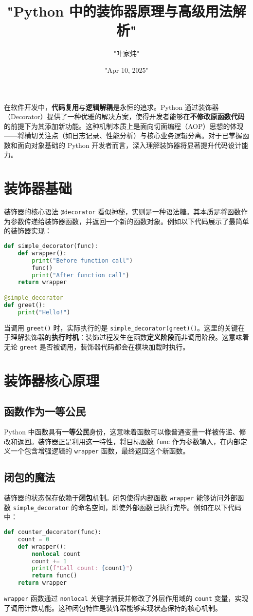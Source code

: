 \title{"Python 中的装饰器原理与高级用法解析"}
\author{"叶家炜"}
\date{"Apr 10, 2025"}
\maketitle
在软件开发中，\textbf{代码复用}与\textbf{逻辑解耦}是永恒的追求。Python 通过装饰器（Decorator）提供了一种优雅的解决方案，使得开发者能够在\textbf{不修改原函数代码}的前提下为其添加新功能。这种机制本质上是面向切面编程（AOP）思想的体现——将横切关注点（如日志记录、性能分析）与核心业务逻辑分离。对于已掌握函数和面向对象基础的 Python 开发者而言，深入理解装饰器将显著提升代码设计能力。\par
\chapter{装饰器基础}
装饰器的核心语法 \verb!@decorator! 看似神秘，实则是一种语法糖。其本质是将函数作为参数传递给装饰器函数，并返回一个新的函数对象。例如以下代码展示了最简单的装饰器实现：\par
\begin{lstlisting}[language=python]
def simple_decorator(func):
    def wrapper():
        print("Before function call")
        func()
        print("After function call")
    return wrapper

@simple_decorator
def greet():
    print("Hello!")
\end{lstlisting}
当调用 \verb!greet()! 时，实际执行的是 \verb!simple_decorator(greet)()!。这里的关键在于理解装饰器的\textbf{执行时机}：装饰过程发生在函数\textbf{定义阶段}而非调用阶段。这意味着无论 \verb!greet! 是否被调用，装饰器代码都会在模块加载时执行。\par
\chapter{装饰器核心原理}
\section{函数作为一等公民}
Python 中函数具有\textbf{一等公民}身份，这意味着函数可以像普通变量一样被传递、修改和返回。装饰器正是利用这一特性，将目标函数 \verb!func! 作为参数输入，在内部定义一个包含增强逻辑的 \verb!wrapper! 函数，最终返回这个新函数。\par
\section{闭包的魔法}
装饰器的状态保存依赖于\textbf{闭包}机制。闭包使得内部函数 \verb!wrapper! 能够访问外部函数 \verb!simple_decorator! 的命名空间，即使外部函数已执行完毕。例如在以下代码中：\par
\begin{lstlisting}[language=python]
def counter_decorator(func):
    count = 0
    def wrapper():
        nonlocal count
        count += 1
        print(f"Call count: {count}")
        return func()
    return wrapper
\end{lstlisting}
\verb!wrapper! 函数通过 \verb!nonlocal! 关键字捕获并修改了外层作用域的 \verb!count! 变量，实现了调用计数功能。这种闭包特性是装饰器能够实现状态保持的核心机制。\par
